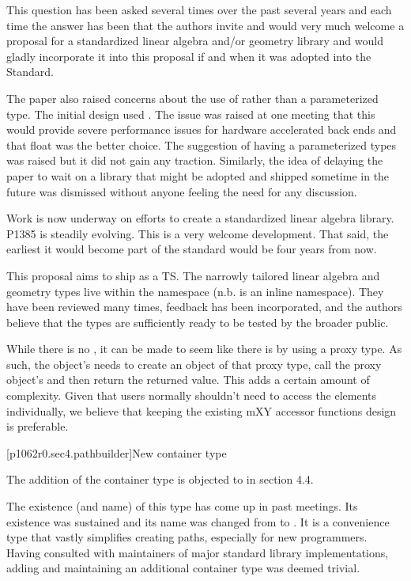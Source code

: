 \pnum
This question has been asked several times over the past several years and each time the answer has been that the authors invite and would very much welcome a proposal for a standardized linear algebra and/or geometry library and would gladly incorporate it into this proposal if and when it was adopted into the Standard.

\pnum
The paper also raised concerns about the use of  rather than a parameterized type. The initial design used . The issue was raised at one meeting that this would provide severe performance issues for hardware accelerated back ends and that float was the better choice. The suggestion of having a parameterized types was raised but it did not gain any traction. Similarly, the idea of delaying the paper to wait on a library that might be adopted and shipped sometime in the future was dismissed without anyone feeling the need for any discussion.

\pnum
Work is now underway on efforts to create a standardized linear algebra library. P1385 is steadily evolving. This is a very welcome development. That said, the earliest it would become part of the standard would be four years from now. 

\pnum
This proposal aims to ship as a TS. The narrowly tailored linear algebra and geometry types live within the  namespace (n.b.  is an inline namespace). They have been reviewed many times, feedback has been incorporated, and the authors believe that the types are sufficiently ready to be tested by the broader public.

\pnum
\begin{note}
While there is no , it can be made to seem like there is by using a proxy type. As such, the  object's  needs to create an object of that proxy type, call the proxy object's  and then return the returned value. This adds a certain amount of complexity. Given that users normally shouldn't need to access the elements individually, we believe that keeping the existing mXY accessor functions design is preferable.
\end{note}

[p1062r0.sec4.pathbuilder]{New container type}

\pnum
The addition of the container type  is objected to in section 4.4.

\pnum
The existence (and name) of this type has come up in past meetings. Its existence was sustained and its name was changed from  to . It is a convenience type that vastly simplifies creating paths, especially for new programmers. Having consulted with maintainers of major standard library implementations, adding and maintaining an additional container type was deemed trivial.

